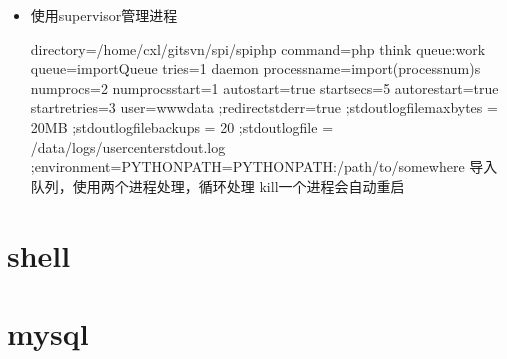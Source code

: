 \documentclass[a4paper,10pt,english]{sphinxmanual}
\begin{document}
\begin{itemize}
\begin{itemize}
\begin{sphinxVerbatim}[commandchars=\\\{\}]
 
               \PYG{p}{[}\PYG{p}{]}
     
\end{sphinxVerbatim}

\item {} 
使用supervisor管理进程

\begin{sphinxVerbatim}
directory=/home/cxl/git\PYGZhy{}svn/spi/spi\PYGZhy{}php
command=php think queue:work \PYGZhy{}\PYGZhy{}queue=\PYGZdq{}importQueue\PYGZdq{} \PYGZhy{}\PYGZhy{}tries=1 \PYGZhy{}\PYGZhy{}daemon
process\PYGZus{}name=import\PYGZus{}\PYGZpc{}(process\PYGZus{}num)s
numprocs=2
numprocs\PYGZus{}start=1
autostart=true
startsecs=5
autorestart=true
startretries=3
user=www\PYGZhy{}data
;redirect\PYGZus{}stderr=true
;stdout\PYGZus{}logfile\PYGZus{}maxbytes = 20MB
;stdout\PYGZus{}logfile\PYGZus{}backups = 20
;stdout\PYGZus{}logfile = /data/logs/usercenter\PYGZus{}stdout.log
;environment=PYTHONPATH=\PYGZdl{}PYTHONPATH:/path/to/somewhere
导入队列，使用两个进程处理，循环处理
kill一个进程会自动重启
\end{sphinxVerbatim}

\end{itemize}

\end{itemize}


\section{shell}
\label{\detokenize{program/shell:shell}}\label{\detokenize{program/shell::doc}}

\section{mysql}
\label{\detokenize{program/mysql::doc}}\label{\detokenize{program/mysql:mysql}}
\end{document}
